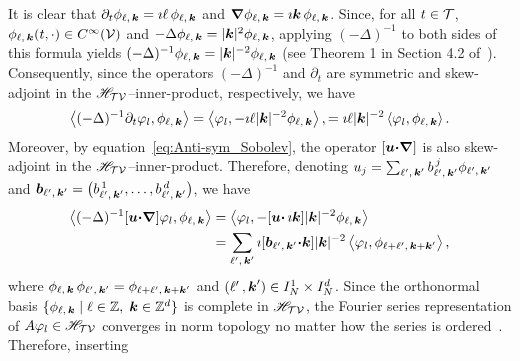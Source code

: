 \documentclass[amsa]{ipart}
\begin{document}
It is clear that
$\partial_t\phi_{\ell,\,\boldsymbol{k}}=\imath\ell\,\phi_{\ell,\,\boldsymbol{k}}$ and
$\mbox{\boldmath${\nabla}$}\phi_{\ell,\,\boldsymbol{k}}=\imath\boldsymbol{k}\,\phi_{\ell,\,\boldsymbol{k}}$. Since, for all $t\in\mathcal{T}$,
$\phi_{\ell,\,\boldsymbol{k}}(t,\cdot)\in C^\infty(\mathcal{V})$ and 
$-\Delta\phi_{\ell,\,\boldsymbol{k}}=|\boldsymbol{k}|^2\phi_{\ell,\,\boldsymbol{k}}$, applying $(-\Delta)^{-1}$ to both
sides of this formula yields
$(-\Delta)^{-1}\phi_{\ell,\,\boldsymbol{k}}=|\boldsymbol{k}|^{-2}\phi_{\ell,\,\boldsymbol{k}}$ (see Theorem 1 in
Section 4.2 of~\cite{McOwen:2003:PDE}). Consequently, since the
operators $(-\Delta)^{-1}$ and $\partial_t$ are symmetric and skew-adjoint in the
$\mathscr{H}_{\mathcal{T}\mathcal{V}}$--inner-product, respectively, we have
%
\begin{align}\label{eq:Fourier_Del_Dt}
  \left\langle(-\Delta)^{-1}\partial_t\varphi_l,\phi_{\ell,\,\veck}\right\rangle
  =\left\langle\varphi_l,-\imath\ell|\veck|^{-2}\phi_{\ell,\,\veck}\right\rangle,
  =\imath\ell|\veck|^{-2}\left\langle\varphi_l,\phi_{\ell,\,\veck}\right\rangle.
\end{align}
%
Moreover, by equation~\eqref{eq:Anti-sym_Sobolev}, the operator
$[\boldsymbol{u}\mbox{\boldmath${\cdot}$}\mbox{\boldmath${\nabla}$}]$ is also skew-adjoint in the
$\mathscr{H}_{\mathcal{T}\mathcal{V}}$--inner-product. Therefore, denoting
$u_j=\sum_{\ell^\prime,\,\boldsymbol{k}^\prime}b^{\,j}_{\ell^\prime,\,\boldsymbol{k}^\prime}\phi_{\ell^\prime,\,\boldsymbol{k}^\prime}$ and
$\boldsymbol{b}_{\ell^\prime,\,\boldsymbol{k}^\prime}=\big(b^{\,1}_{\ell^\prime,\,\boldsymbol{k}^\prime},\ldots,b^{\,d}_{\ell^\prime,\,\boldsymbol{k}^\prime}\big)$,
we have 
%
\begin{align}\label{eq:Fourier_Del_u_grad}   
  \left\langle(-\Delta)^{-1}[\vecu\bcdot\bnabla]\varphi_l,\phi_{\ell,\,\veck}\right\rangle
  &=\left\langle\varphi_l,-[\vecu\bcdot\,\imath\veck]|\veck|^{-2}\phi_{\ell,\,\veck}\right\rangle
  \\\notag
  &=\sum_{\ell^\prime,\,\veck^\prime}
  \imath[\vecb_{\ell^\prime,\,\veck^\prime}\bcdot\veck]|\veck|^{-2}
  \left\langle\varphi_l,\phi_{\ell+\ell^\prime,\,\veck+\veck^\prime}\right\rangle,
\end{align}
%
where $\phi_{\ell,\,\boldsymbol{k}}\,\phi_{\ell^\prime,\,\boldsymbol{k}^\prime}=\phi_{\ell+\ell^\prime,\,\boldsymbol{k}+\boldsymbol{k}^\prime}$ and
$(\ell^\prime\,,\boldsymbol{k}^\prime)\in I_N^1\times I_N^d$. Since the orthonormal basis
$\{\phi_{\ell,\,\boldsymbol{k}} \;|\; \ell\in\mathbb{Z},\;\boldsymbol{k}\in\mathbb{Z}^d\}$ is complete
in $\mathscr{H}_{\mathcal{T}\mathcal{V}}$, the Fourier series representation of 
$A\varphi_l\in\mathscr{H}_{\mathcal{T}\mathcal{V}}$ converges in norm topology no matter how the
series is ordered~\cite{Folland:99:RealAnalysis}. Therefore, inserting 
\end{document}
